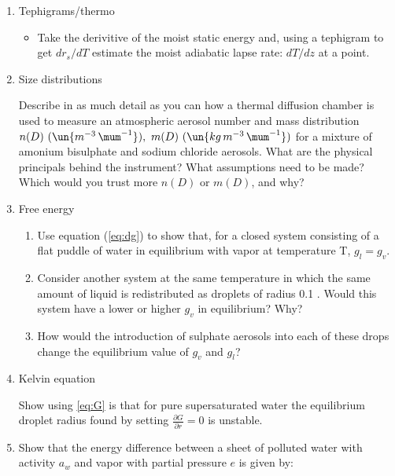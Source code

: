 \documentclass[12pt]{article}
\begin{document}
\noindent

\begin{enumerate}


\item Tephigrams/thermo

  \begin{itemize}
  \item Take the derivitive of the moist static energy and, using a tephigram
  to get $dr_s/dT$
  estimate the moist adiabatic lapse rate:  $dT/dz$ at a point.


  \end{itemize}



\item  Size distributions

\par

Describe in as much detail as you can how a thermal diffusion
chamber is used to measure an atmospheric aerosol number and mass
distribution $n(D)\ (\un{m^{-3}\,\mum^{-1}}),\ m(D)\
(\un{kg\,m^{-3}\,\mum^{-1}})$ for a mixture of amonium bisulphate and
sodium chloride aerosols.  What are the physical principals
behind the instrument?  What assumptions need to be made?  Which would
you trust more $n(D)$ or $m(D)$, and why?



\item  Free energy

  \begin{enumerate}
  \item Use equation (\ref{eq:dg}) to show that, for a closed system consisting of a
flat puddle of water in equilibrium with vapor at temperature T, $g_l = g_v$.
\item Consider another system at the same temperature in which the same amount of liquid is
  redistributed as droplets of radius 0.1 \mum.  Would this system have
  a lower or higher $g_v$ in equilibrium?  Why?
\item How would the introduction of sulphate aerosols into each of these drops
change the equilibrium value of $g_v$ and $g_l$?
  \end{enumerate}


\item Kelvin equation

Show using \ref{eq:G} is that for pure supersaturated water
the equilibrium droplet radius found by setting
$\frac{\partial G }{\partial r} = 0$ is unstable.


\item Show that the energy difference between a sheet of polluted
water with activity $a_w$ and vapor with partial pressure
$e$ is given by:


\end{enumerate}
\end{document}

